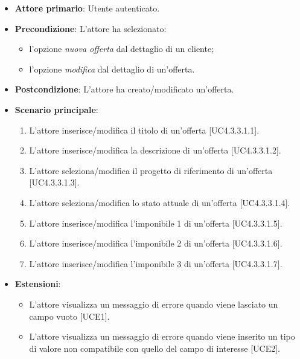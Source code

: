 \begin{itemize}
\item \textbf{Attore primario}: Utente autenticato.
\item \textbf{Precondizione}: L'attore ha selezionato: 
\begin{itemize}
\item l'opzione \textit{nuova offerta} dal dettaglio di un cliente;
\item l'opzione \textit{modifica} dal dettaglio di un'offerta.
\end{itemize}
\item \textbf{Postcondizione}: L'attore ha creato/modificato un'offerta.
\item \textbf{Scenario principale}: 
\begin{enumerate}
\item L'attore inserisce/modifica il titolo di un'offerta [UC4.3.3.1.1].
\item L'attore inserisce/modifica la descrizione di un'offerta [UC4.3.3.1.2].
\item L'attore seleziona/modifica il progetto di riferimento di un'offerta [UC4.3.3.1.3].
\item L'attore seleziona/modifica lo stato attuale di un'offerta [UC4.3.3.1.4].
\item L'attore inserisce/modifica l'imponibile 1 di un'offerta [UC4.3.3.1.5].
\item L'attore inserisce/modifica l'imponibile 2 di un'offerta [UC4.3.3.1.6].
\item L'attore inserisce/modifica l'imponibile 3 di un'offerta [UC4.3.3.1.7].
\end{enumerate}
\item \textbf{Estensioni}: 
\begin{itemize}
\item L'attore visualizza un messaggio di errore quando viene lasciato un campo vuoto [UCE1].
\item L'attore visualizza un messaggio di errore quando viene inserito un tipo di valore non compatibile con quello del campo di interesse [UCE2].
\end{itemize} 
\end{itemize}

\pagebreak

